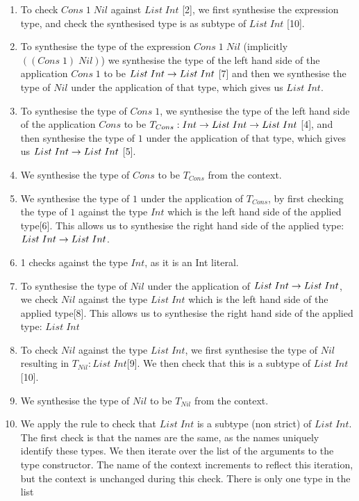 \begin{enumerate}
    \item To check $Cons\;1\;Nil$ against $List\;Int$ [2], we first synthesise the expression type, and check the synthesised type is as subtype of $List\;Int$ [10].
    \item To synthesise the type of the expression $Cons\;1\;Nil$ (implicitly $((Cons\;1)\;Nil)$) we synthesise the type of the left hand side of the application $Cons\;1$ to be $List\;Int\rightarrow List\;Int$ [7] and then we synthesise the type of $Nil$ under the application of that type, which gives us $List\;Int$.
    \item To synthesise the type of $Cons\;1$, we synthesise the type of the left hand side of the application $Cons$ to be $T_{Cons}: Int\rightarrow List\;Int\rightarrow List\;Int$ [4], and then synthesise the type of $1$ under the application of that type, which gives us $List\;Int\rightarrow List\;Int$ [5].
    \item We synthesise the type of $Cons$ to be $T_{Cons}$ from the context.
    \item We synthesise the type of $1$ under the application of $T_{Cons}$, by first checking the type of $1$ against the type $Int$ which is the left hand side of the applied type[6]. This allows us to synthesise the right hand side of the applied type: $List\;Int\rightarrow List\;Int$. 
    \item 1 checks against the type $Int$, as it is an Int literal.
    \item To synthesise the type of $Nil$ under the application of $List\;Int\rightarrow List\;Int$, we check $Nil$ against the type $List\;Int$ which is the left hand side of the applied type[8]. This allows us to synthesise the right hand side of the applied type: $List\;Int$
    \item To check $Nil$ against the type $List\;Int$, we first synthesise the type of $Nil$ resulting in $T_{Nil} :List\;Int$[9]. We then check that this is a subtype of $List\;Int$[10].
    \item We synthesise the type of $Nil$ to be $T_{Nil}$ from the context.
    \item We apply the \MyTCRule{\Unionsubrulename} rule to check that $List\;Int$ is a subtype (non strict) of $List\;Int$. The first check is that the names are the same, as the names uniquely identify these types. We then iterate over the list of the arguments to the type constructor. The name of the context increments to reflect this iteration, but the context is unchanged during this check. There is only one type in the list
\end{enumerate}

